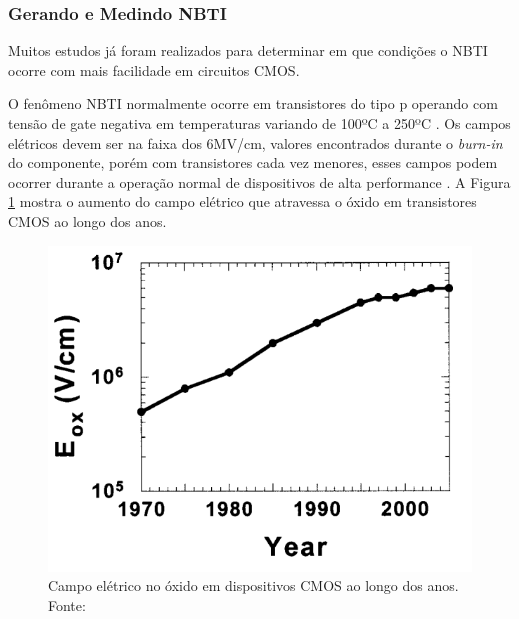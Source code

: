 \subsubsection{Gerando e Medindo NBTI}
\label{sec:GerandoNbti}

Muitos estudos já foram realizados para determinar em que condições o NBTI ocorre com mais facilidade em circuitos CMOS.

O fenômeno NBTI normalmente ocorre em transistores do tipo p operando com tensão de gate negativa em temperaturas variando de 100ºC a 250ºC \cite{Davidovic}. Os campos elétricos devem ser na faixa dos 6MV/cm, valores encontrados durante o \textit{burn-in} do componente, porém com transistores cada vez menores, esses campos podem ocorrer durante a operação normal de dispositivos de alta performance \cite{Schroder}. A Figura \ref{fig:CampoEletricoAno} mostra o aumento do campo elétrico que atravessa o óxido em transistores CMOS ao longo dos anos.

\begin{figure}[H]
    \centering
    \includegraphics[scale=0.5]{figures/ReferencialTeorico/CampoEletricoAno.png}
    \caption{Campo elétrico no óxido em dispositivos CMOS ao longo dos anos. Fonte: \cite{Schroder}}
    \label{fig:CampoEletricoAno}
\end{figure}


